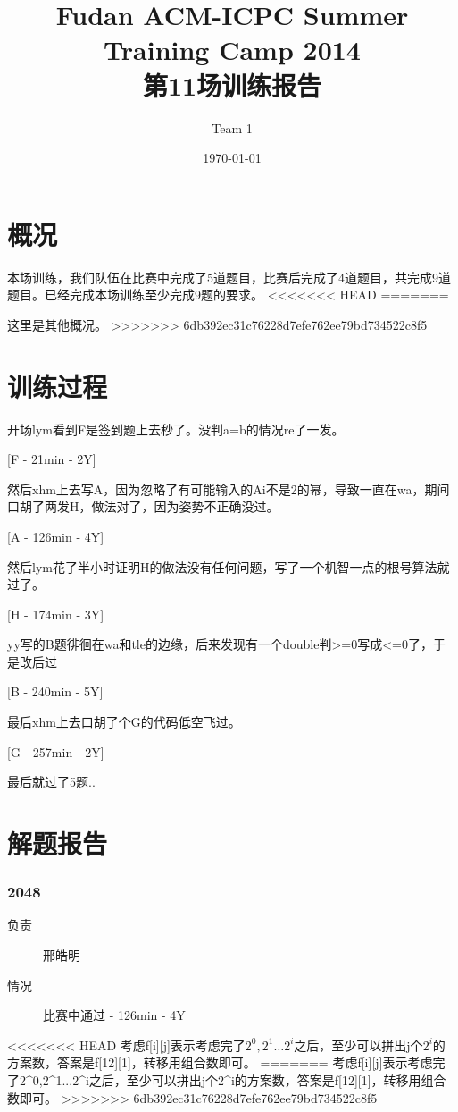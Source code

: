 \documentclass[a4paper, 11pt, nofonts, nocap, fancyhdr]{ctexart}
\title{Fudan ACM-ICPC Summer Training Camp 2014\\第11场训练报告}
\author{Team 1}
\date{\today}
\newcommand{\problem}[1]{\subsubsection{#1}}
\begin{document}
\maketitle

\section{概况}

本场训练，我们队伍在比赛中完成了5道题目，比赛后完成了4道题目，共完成9道题目。已经完成本场训练至少完成9题的要求。
<<<<<<< HEAD
=======

这里是其他概况。
>>>>>>> 6db392ec31c76228d7efe762ee79bd734522c8f5

\section{训练过程}

开场lym看到F是签到题上去秒了。没判a=b的情况re了一发。

[F - 21min - 2Y]

然后xhm上去写A，因为忽略了有可能输入的Ai不是2的幂，导致一直在wa，期间口胡了两发H，做法对了，因为姿势不正确没过。

[A - 126min - 4Y]

然后lym花了半小时证明H的做法没有任何问题，写了一个机智一点的根号算法就过了。

[H - 174min - 3Y]

yy写的B题徘徊在wa和tle的边缘，后来发现有一个double判>=0写成<=0了，于是改后过

[B - 240min - 5Y]

最后xhm上去口胡了个G的代码低空飞过。

[G - 257min - 2Y]

最后就过了5题..

\section{解题报告}

\problem{2048}

\begin{description}
\item[负责] 邢皓明
\item[情况] 比赛中通过 - 126min - 4Y
\end{description}

<<<<<<< HEAD
考虑f[i][j]表示考虑完了$2^0,2^1\dots 2^i$之后，至少可以拼出j个$2^i$的方案数，答案是f[12][1]，转移用组合数即可。
=======
考虑f[i][j]表示考虑完了2^0,2^1...2^i之后，至少可以拼出j个2^i的方案数，答案是f[12][1]，转移用组合数即可。
>>>>>>> 6db392ec31c76228d7efe762ee79bd734522c8f5
\end{document}
